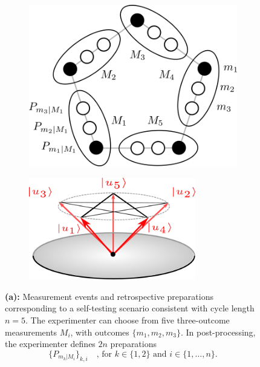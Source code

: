 \begin{figure}
	\begin{subfigure}[t]{0.45\textwidth}
    	\centering
    	\includegraphics[width=\textwidth]{images/mntsandpreps.png}
        \caption{}
	\end{subfigure}
	\hfill
    \begin{subfigure}[t]{0.45\textwidth}
    	\centering 
        \includegraphics[width=0.8\textwidth]{images/kcbsrefstates.png}
        \caption{}
    \end{subfigure}
    \caption{\textbf{(a):} Measurement events and retrospective preparations corresponding to a self-testing scenario consistent with cycle length $n=5$. The experimenter can choose from five three-outcome measurements $M_i$, with outcomes $\{m_1,m_2,m_3\}$. In post-processing, the experimenter defines $2n$ preparations 
\begin{equation*}\{P_{m_k\vert M_i}\}_{k,i}\hspace{1em}\text{, for } k\in\{1,2\}\text{ and }i\in\{1,\dots,n\}.\end{equation*}
}
\end{figure}
